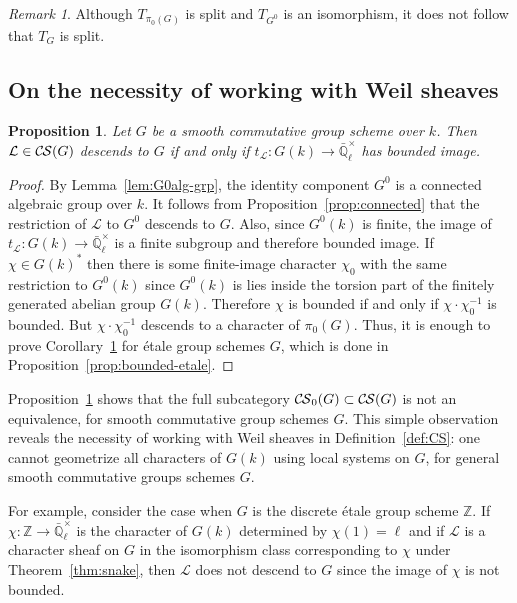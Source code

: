 \documentclass[10pt]{amsart}
\theoremstyle{plain}
\newtheorem{proposition}[theorem]{Proposition}
\theoremstyle{definition}
\theoremstyle{remark}
\newtheorem{remark}[theorem]{Remark}
\newcommand{\ZZ}{{\mathbb{Z}}}
\newcommand{\EE}{\mathbb{\bar Q}_\ell}
\newcommand{\Fq}{k}
\newcommand{\EEx}{\EE^\times}
\newcommand{\trFrob}[1]{t_{#1}}
\newcommand{\TrFrob}[1]{T_{#1}}
\newcommand{\cs}[1]{{\mathcal{#1}}}
\newcommand{\CS}{{\mathcal{C\hskip-0.8pt S}}}
\newcommand{\bCS}{{\CS_0}}
\begin{document}
\begin{remark}
Although $\TrFrob{\pi_0(G)}$ is split and $\TrFrob{G^0}$ is an isomorphism, it does not follow that $\TrFrob{G}$ is split. 
\end{remark}

\subsection{On the necessity of working with Weil sheaves}

\begin{proposition} \label{prop:bounded}
Let $G$ be a smooth commutative group scheme over $\Fq$. 
Then $\cs{L}\in \CS(G)$ descends to $G$ if and only if $\trFrob{\cs{L}} : G(\Fq) \to \EEx$ has bounded image.
\end{proposition}
\begin{proof} 
By Lemma~\ref{lem:G0alg-grp}, the identity component $G^0$ is a connected algebraic group over $\Fq$. 
It follows from Proposition~\ref{prop:connected} that the restriction of $\cs{L}$ to $G^0$ descends to $G$. 
Also, since $G^0(\Fq)$ is finite, the image of $\trFrob{\cs{L}} : G(\Fq) \to \EEx$ is a finite subgroup and therefore bounded image.  
%
If $\chi \in G(\Fq)^*$ then there is some finite-image character $\chi_0$
with the same restriction to $G^0(\Fq)$ since $G^0(\Fq)$ is lies inside the torsion part of
the finitely generated abelian group $G(\Fq)$.  Therefore $\chi$ is bounded 
if and only if $\chi \cdot \chi_0^{-1}$ is bounded.  But $\chi \cdot \chi_0^{-1}$ descends
to a character of $\pi_0(G)$.
Thus, it is enough to prove Corollary~\ref{prop:bounded}
for \'etale group schemes $G$, which is done in Proposition~\ref{prop:bounded-etale}.
\end{proof}

Proposition~\ref{prop:bounded} shows that the full subcategory
$\bCS(G) \subset \CS(G)$ is not an equivalence, for smooth commutative group schemes $G$.
This simple observation reveals the necessity of working with Weil sheaves in Definition~\ref{def:CS}: one cannot geometrize all characters of $G(\Fq)$ using local systems on $G$, for general smooth commutative groups schemes $G$. 

For example, consider the case when $G$ is the discrete \'etale group scheme $\ZZ$.
If $\chi : \ZZ \to \EEx$ is the character of $G(\Fq)$ determined by $\chi(1) = \ell$
and if $\cs{L}$ is a character sheaf on $G$ in the isomorphism class
corresponding to $\chi$ under Theorem~\ref{thm:snake},
then $\cs{L}$ does not descend to $G$ since the image of $\chi$ is not
bounded.
\end{document}
